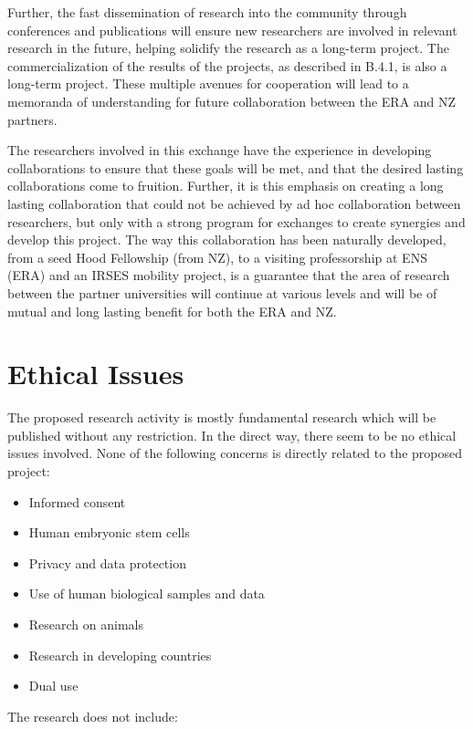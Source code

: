\documentclass[12pt]{article}
\begin{document}
Further, the fast dissemination of research into the community through conferences and publications will ensure new researchers are involved in relevant research in the future, helping solidify the research as a long-term project.
The commercialization of the results of the projects, as described in  B.4.1, is also a long-term project.
These multiple avenues for cooperation will lead to a memoranda of understanding for future collaboration between the ERA and NZ partners.


The researchers involved in this exchange have the experience in developing collaborations to ensure that these goals will be met, and that the desired lasting collaborations come to fruition. Further, it is this emphasis on creating a long lasting collaboration that could not be achieved by ad hoc collaboration between researchers, but only with a strong program for exchanges to create synergies and develop this project. The way this collaboration has been naturally developed, from a seed Hood Fellowship (from NZ), to a visiting professorship at ENS (ERA) and an IRSES mobility project, is a guarantee that the area of research between the partner universities will continue at various levels and will be of mutual and long lasting benefit for both the ERA and NZ.


\section{Ethical Issues}

The proposed research activity is mostly fundamental research which will be published without any restriction. In the direct way, there seem to be no ethical issues involved.
None of the following concerns is directly related to the proposed project:

\begin{itemize}
\item               Informed consent
\item              Human embryonic stem cells
\item              Privacy and data protection
\item              Use of human biological samples and data
\item              Research on animals
\item              Research in developing countries
\item              Dual use
\end{itemize}


The research does not include:
\end{document}
